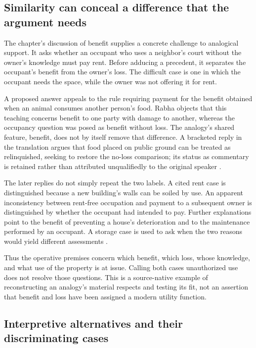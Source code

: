 \subsection{Similarity can conceal a difference that the argument needs}
\label{sec:p18-talmudic-benefit-loss}

The chapter's discussion of benefit supplies a concrete challenge
to analogical support. It asks whether an occupant who uses a
neighbor's court without the owner's knowledge must pay rent.
Before adducing a precedent, it separates the occupant's benefit
from the owner's loss. The difficult case is one in which the
occupant needs the space, while the owner was not offering it
for rent.

A proposed answer appeals to the rule requiring payment for the
benefit obtained when an animal consumes another person's food.
Rabha objects that this teaching concerns benefit to one party
with damage to another, whereas the occupancy question was posed
as benefit without loss. The analogy's shared feature, benefit,
does not by itself remove that difference. A bracketed reply in
the translation argues that food placed on public ground can be
treated as relinquished, seeking to restore the no-loss comparison;
its status as commentary is retained rather than attributed
unqualifiedly to the original speaker
\parencite[pp.~40--41]{RodkinsonBabaKamaCopyright1900}.

The later replies do not simply repeat the two labels. A cited
rent case is distinguished because a new building's walls can
be soiled by use. An apparent inconsistency between rent-free
occupation and payment to a subsequent owner is distinguished
by whether the occupant had intended to pay. Further explanations
point to the benefit of preventing a house's deterioration and
to the maintenance performed by an occupant. A storage case is
used to ask when the two reasons would yield different assessments
\parencite[pp.~41--42]{RodkinsonBabaKamaCopyright1900}.

Thus the operative premises concern which benefit, which loss,
whose knowledge, and what use of the property is at issue.
Calling both cases unauthorized use does not resolve those
questions. This is a source-native example of reconstructing
an analogy's material respects and testing its fit, not an
assertion that benefit and loss have been assigned a modern
utility function.

\subsection{Interpretive alternatives and their discriminating cases}
\label{sec:p18-talmudic-causal-classification}

